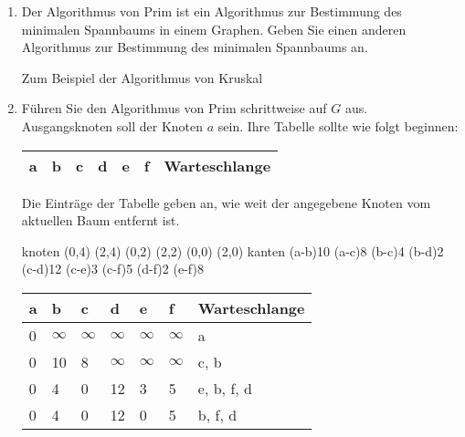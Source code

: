 \documentclass{lehramt-informatik-aufgabe}
\begin{document}
\begin{enumerate}


\item Der Algorithmus von Prim ist ein Algorithmus zur Bestimmung des
minimalen Spannbaums in einem Graphen. Geben Sie einen anderen
Algorithmus zur Bestimmung des minimalen Spannbaums an.

\begin{liAntwort}
Zum Beispiel der Algorithmus von Kruskal
\end{liAntwort}


\item Führen Sie den Algorithmus von Prim schrittweise auf $G$ aus.
Ausgangsknoten soll der Knoten $a$ sein. Ihre Tabelle sollte wie folgt
beginnen:

\begin{tabular}{|l|l|l|l|l|l|l|}
\hline
a &
b &
c &
d &
e &
f &
Warteschlange\\\hline
\end{tabular}

Die Einträge der Tabelle geben an, wie weit der angegebene Knoten
vom aktuellen Baum entfernt ist.

\begin{liAntwort}
\graph knoten {
  (0,4)
  (2,4)
  (0,2)
  (2,2)
  (0,0)
  (2,0)
} kanten {
  \kante(a-b){10}
  \KANTE(a-c){8}
  \KANTE(b-c){4}
  \KANTE(b-d){2}
  \kante(c-d){12}
  \KANTE(c-e){3}
  \kante(c-f){5}
  \KANTE(d-f){2}
  \kante(e-f){8}
}

\begin{tabular}{|l|l|l|l|l|l|l|}
\hline
a &
b &
c &
d &
e &
f &
Warteschlange\\\hline\hline

0 & %
$\infty$ & %
$\infty$ & %
$\infty$ & %
$\infty$ & %
$\infty$ & %
a \\\hline %

0 & %
10 & %
8 & %
$\infty$ & %
$\infty$ & %
$\infty$ & %
c, b\\\hline %

0 & %
4 & %
0 & %
12 & %
3 & %
5 & %
e, b, f, d\\\hline %

0 & %
4 & %
0 & %
12 & %
0 & %
5 & %
b, f, d \\\hline %


\end{tabular}
\end{liAntwort}
\end{enumerate}
\end{document}
